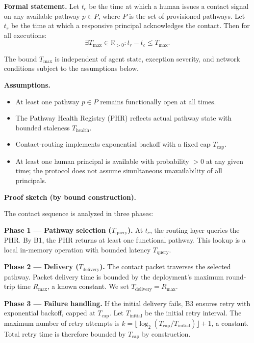 \textbf{Formal statement.} Let $t_c$ be the time at which a human issues a contact signal on any available pathway $p \in P$, where $P$ is the set of provisioned pathways. Let $t_r$ be the time at which a responsive principal acknowledges the contact. Then for all executions:
\[
\exists T_{\max} \in \mathbb{R}_{>0} : t_r - t_c \leq T_{\max}.
\]

The bound $T_{\max}$ is independent of agent state, exception severity, and network conditions subject to the assumptions below.

\medskip\noindent\textbf{Assumptions.}
\begin{itemize}\itemsep0em
    \item[(B1)] At least one pathway $p \in P$ remains functionally open at all times.
    \item[(B2)] The Pathway Health Registry (PHR) reflects actual pathway state with bounded staleness $T_{\text{health}}$.
    \item[(B3)] Contact-routing implements exponential backoff with a fixed cap $T_{\text{cap}}$.
    \item[(B4)] At least one human principal is available with probability $> 0$ at any given time; the protocol does not assume simultaneous unavailability of all principals.
\end{itemize}

\medskip\noindent\textbf{Proof sketch (by bound construction).}

The contact sequence is analyzed in three phases:

\textbf{Phase 1 — Pathway selection ($T_{\text{query}}$).} At $t_c$, the routing layer queries the PHR. By B1, the PHR returns at least one functional pathway. This lookup is a local in-memory operation with bounded latency $T_{\text{query}}$.

\textbf{Phase 2 — Delivery ($T_{\text{delivery}}$).} The contact packet traverses the selected pathway. Packet delivery time is bounded by the deployment's maximum round-trip time $R_{\max}$, a known constant. We set $T_{\text{delivery}} = R_{\max}$.

\textbf{Phase 3 — Failure handling.} If the initial delivery fails, B3 ensures retry with exponential backoff, capped at $T_{\text{cap}}$. Let $T_{\text{initial}}$ be the initial retry interval. The maximum number of retry attempts is $k = \lfloor \log_2(T_{\text{cap}} / T_{\text{initial}}) \rfloor + 1$, a constant. Total retry time is therefore bounded by $T_{\text{cap}}$ by construction.

